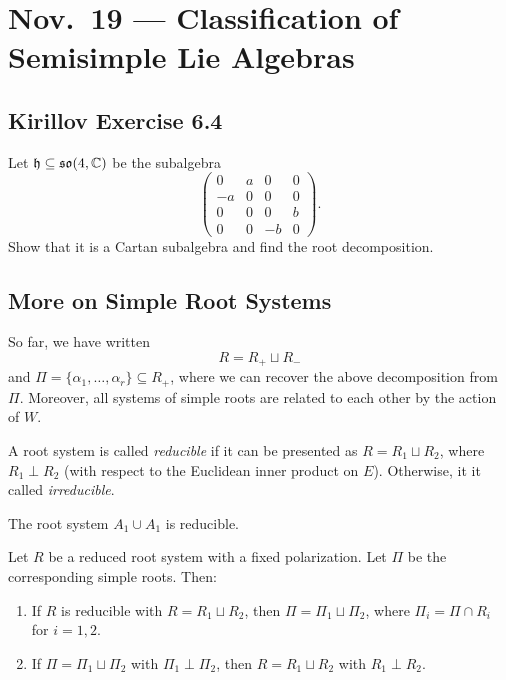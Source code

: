 \chapter{Nov.~19 --- Classification of Semisimple Lie Algebras}

\section{Kirillov Exercise 6.4}

\begin{exercise}
  Let $\mathfrak{h} \subseteq \mathfrak{so}(4, \mathbb{C})$
  be the subalgebra
  \[
    \begin{pmatrix}
      0 & a & 0 & 0 \\
      -a & 0 & 0 & 0 \\
      0 & 0 & 0 & b \\
      0 & 0 & -b & 0
    \end{pmatrix}.
  \]
  Show that it is a Cartan subalgebra
  and find the root decomposition.
\end{exercise}

\section{More on Simple Root Systems}

\begin{remark}
  So far, we have written
  \[
    R = R_+ \sqcup R_-
  \]
  and $\Pi = \{\alpha_1, \dots, \alpha_r\} \subseteq R_+$,
  where we can recover
  the above decomposition from $\Pi$.
  Moreover, all systems of
  simple roots are related to each
  other by the action of $W$.
\end{remark}

\begin{definition}
  A root system is called \emph{reducible}
  if it can be presented as
  $R = R_1 \sqcup R_2$, where
  $R_1 \perp R_2$ (with respect
  to the Euclidean inner product on
  $E$). Otherwise, it it
  called \emph{irreducible}.
\end{definition}

\begin{example}
  The root system $A_1 \cup A_1$
  is reducible.
\end{example}

\begin{lemma}
  Let $R$ be a reduced root system
  with a fixed polarization.
  Let $\Pi$ be the corresponding
  simple roots. Then:
  \begin{enumerate}
    \item If $R$ is reducible with
      $R = R_1 \sqcup R_2$, then
      $\Pi = \Pi_1 \sqcup \Pi_2$,
      where $\Pi_i = \Pi \cap R_i$
      for $i = 1, 2$.
    \item If $\Pi = \Pi_1 \sqcup \Pi_2$
      with $\Pi_1 \perp \Pi_2$, then
      $R = R_1 \sqcup R_2$ with
      $R_1 \perp R_2$.
  \end{enumerate}
\end{lemma}

